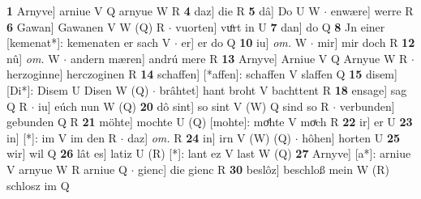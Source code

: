 \documentclass[8pt,a4paper,notitlepage]{article}
\begin{document}
\begin{table}[ht]
\begin{minipage}[t]{0.5\linewidth}
\textbf{1} Arnyve] arniue V Q arnyue W R \textbf{4} daz] die R \textbf{5} dâ] Do U W  $\cdot$ enwære] werre R \textbf{6} Gawan] Gawanen V W (Q) R  $\cdot$ vuorten] vuͦrt in U \textbf{7} dan] do Q \textbf{8} Jn einer [kemenat*]: kemenaten er sach V  $\cdot$ er] er do Q \textbf{10} iu] \textit{om.} W  $\cdot$ mir] mir doch R \textbf{12} nû] \textit{om.} W  $\cdot$ andern mæren] andrú mere R \textbf{13} Arnyve] Arniue V Q Arnyue W R  $\cdot$ herzoginne] herczoginen R \textbf{14} schaffen] [*affen]: schaffen V slaffen Q \textbf{15} disem] [Di*]: Disem U Disen W (Q)  $\cdot$ brâhtet] hant broht V bachttent R \textbf{18} ensage] sag Q R  $\cdot$ iu] eúch nun W (Q) \textbf{20} dô sint] so sint V (W) Q sind so R  $\cdot$ verbunden] gebunden Q R \textbf{21} möhte] mochte U (Q) [mohte]: moͤhte  V moͯch R \textbf{22} ir] er U \textbf{23} in] [*]: im V im den R  $\cdot$ daz] \textit{om.} R \textbf{24} in] irn V (W) (Q)  $\cdot$ hôhen] horten U \textbf{25} wir] wil Q \textbf{26} lât es] latiz U (R) [*]: lant ez  V last W (Q) \textbf{27} Arnyve] [a*]: arniue V arnyue W R arniue Q  $\cdot$ gienc] die gienc R \textbf{30} beslôz] beschloß mein W (R) schlosz im Q \newline
\end{minipage}
\end{table}
\end{document}
